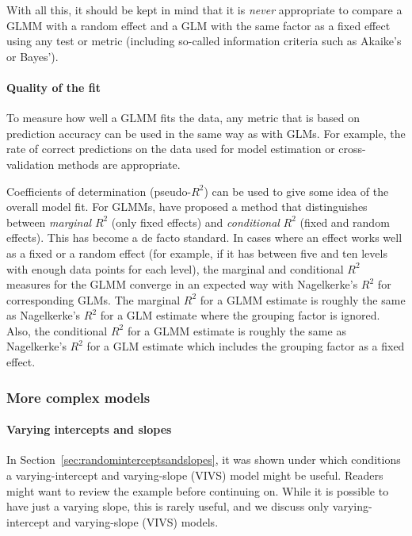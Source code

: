 With all this, it should be kept in mind that it is \textit{never} appropriate to compare a GLMM with a random effect and a GLM with the same factor as a fixed effect using any test or metric (including so-called information criteria such as Akaike's or Bayes').

\paragraph{Quality of the fit}

To measure how well a GLMM fits the data, any metric that is based on prediction accuracy can be used in the same way as with GLMs.
For example, the rate of correct predictions on the data used for model estimation or cross-validation methods are appropriate.

Coefficients of determination (pseudo-$R^2$) can be used to give some idea of the overall model fit.
For GLMMs, \citet{NakagawaSchielzeth2013} have proposed a method that distinguishes between \textit{marginal} $R^2$ (only fixed effects) and \textit{conditional} $R^2$ (fixed and random effects).
This has become a de facto standard.
In cases where an effect works well as a fixed or a random effect (for example, if it has between five and ten levels with enough data points for each level), the marginal and conditional $R^2$ measures for the GLMM converge in an expected way with Nagelkerke's $R^2$ for corresponding GLMs.
The marginal $R^2$ for a GLMM estimate is roughly the same as Nagelkerke's $R^2$ for a GLM estimate where the grouping factor is ignored.
Also, the conditional $R^2$ for a GLMM estimate is roughly the same as Nagelkerke's $R^2$ for a GLM estimate which includes the grouping factor as a fixed effect.


\subsubsection{More complex models}
\label{sec:morecomplexmodels}

\paragraph{Varying intercepts and slopes}

In Section~\ref{sec:randominterceptsandslopes}, it was shown under which conditions a varying-intercept and varying-slope (VIVS) model might be useful.
Readers might want to review the example before continuing on.
While it is possible to have just a varying slope, this is rarely useful, and we discuss only varying-intercept and varying-slope (VIVS) models.

